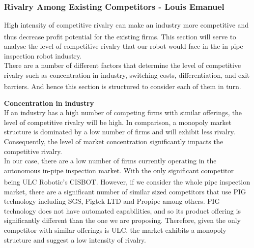 \documentclass[11pt]{article}		%
\newcommand{\supercite}[1]{\textsuperscript{\cite{#1}}}		%
\begin{document}
            \subsubsection{Rivalry Among Existing Competitors - Louis Emanuel}
				High intensity of competitive rivalry can make an industry more competitive and thus decrease profit potential for the existing firms\supercite{porter2008five}. This section will serve to analyse the level of competitive rivalry that our robot would face in the in-pipe inspection robot industry. \\
		        \hspace*{3ex}There are a number of different factors that determine the level of competitive rivalry such as concentration in industry, switching costs, differentiation, and exit barriers\supercite{rivalryfactorsCI}. And hence this section is structured to consider each of them in turn. 
		        
		        \textbf{Concentration in industry}\\
		        If an industry has a high number of competing firms with similar offerings, the level of competitive rivalry will be high. In comparison, a monopoly market structure is dominated by a low number of firms and will exhibit less rivalry. Consequently, the level of market concentration significantly impacts the competitive rivalry.\\
		        \hspace*{3ex}In our case, there are a low number of firms currently operating in the autonomous in-pipe inspection market. With the only significant competitor being ULC Robotic’s CISBOT\supercite{cisbotbeast}. However, if we consider the whole pipe inspection market, there are a significant number of similar sized competitors that use PIG technology including SGS, Pigtek LTD and Propipe among others. PIG technology does not have automated capabilities, and so its product offering is significantly different than the one we are proposing. Therefore, given the only competitor with similar offerings is ULC, the market exhibits a monopoly structure and suggest a low intensity of rivalry.
		        
\end{document}
